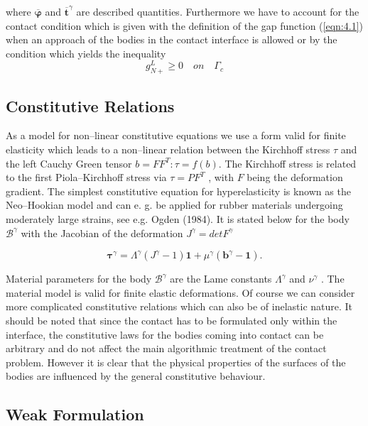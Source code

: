 where $\overline{\boldsymbol{\varphi}}$ and $\overline{\mathbf{t}}^{\gamma} $  are described quantities. Furthermore we have to account for the contact
condition which is given  with the deﬁnition of the gap function (\ref{eqn:4.1}) when
an approach of the bodies in the contact interface is allowed or by the condition which yields the inequality
\begin{equation}
     g_{N+}^{L} \geq 0 \quad  on  \quad \Gamma_{c} 
     \label{eqn:4.26} 
\end{equation}
\subsection{Constitutive Relations}

As a model for non–linear constitutive equations we use a form valid for ﬁnite elasticity which
leads to a non–linear relation between the Kirchhoﬀ stress $\tau$ and the left Cauchy Green tensor
$ b = F F^ T : \tau = f ( b )$. The Kirchhoﬀ stress is related to the ﬁrst Piola–Kirchhoﬀ stress via
$\tau = P F ^T$ , with $F$ being the deformation gradient. The simplest constitutive equation for
hyperelasticity is known as the Neo–Hookian model and can e. g. be applied for rubber
materials undergoing moderately large strains, see e.g. Ogden (1984). It is stated below for
the body $\mathcal{B}^\gamma$ with the Jacobian of the deformation $J ^ \gamma = det F ^\gamma$

\begin{equation}
    \label{eqn:4.27} 
     \boldsymbol{\tau}^{\gamma}=\Lambda^{\gamma}\left(J^{\gamma}-1\right) \mathbf{1}+\mu^{\gamma}\left(\mathbf{b}^{\gamma}-\mathbf{1}\right).
\end{equation}

Material parameters for the body $\mathcal{B}^\gamma$ are the Lame constants $\Lambda^\gamma$ and $\nu^\gamma$ . The material
model is valid for ﬁnite elastic deformations. Of course we can consider more complicated
constitutive relations which can also be of inelastic nature. It should be noted that since the
contact has to be formulated only within the interface, the constitutive laws for the bodies coming into contact can be arbitrary and do not aﬀect the main algorithmic treatment of
the contact problem. However it is clear that the physical properties of the surfaces of the
bodies are inﬂuenced by the general constitutive behaviour.
\subsection{Weak Formulation}

